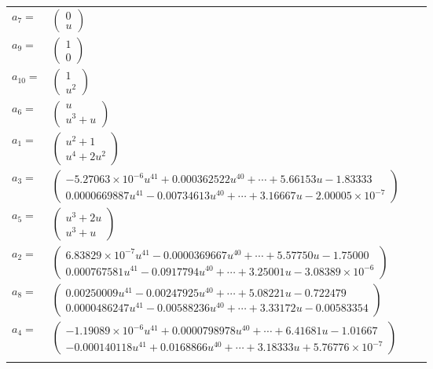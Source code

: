 \documentclass[1p]{elsarticle_modified}
\theoremstyle{definition}
\begin{document}
\begin{tabular}{m{7pt} m{180pt} m{7pt} m{180pt} }
\flushright $a_{7}=$&$\begin{pmatrix}0\\u\end{pmatrix}$ \\
\flushright $a_{9}=$&$\begin{pmatrix}1\\0\end{pmatrix}$ \\
\flushright $a_{10}=$&$\begin{pmatrix}1\\u^2\end{pmatrix}$ \\
\flushright $a_{6}=$&$\begin{pmatrix}u\\u^3+u\end{pmatrix}$ \\
\flushright $a_{1}=$&$\begin{pmatrix}u^2+1\\u^4+2 u^2\end{pmatrix}$ \\
\flushright $a_{3}=$&$\begin{pmatrix}-5.27063\times10^{-6} u^{41}+0.000362522 u^{40}+\cdots+5.66153 u-1.83333\\0.0000669887 u^{41}-0.00734613 u^{40}+\cdots+3.16667 u-2.00005\times10^{-7}\end{pmatrix}$ \\
\flushright $a_{5}=$&$\begin{pmatrix}u^3+2 u\\u^3+u\end{pmatrix}$ \\
\flushright $a_{2}=$&$\begin{pmatrix}6.83829\times10^{-7} u^{41}-0.0000369667 u^{40}+\cdots+5.57750 u-1.75000\\0.000767581 u^{41}-0.0917794 u^{40}+\cdots+3.25001 u-3.08389\times10^{-6}\end{pmatrix}$ \\
\flushright $a_{8}=$&$\begin{pmatrix}0.00250009 u^{41}-0.00247925 u^{40}+\cdots+5.08221 u-0.722479\\0.0000486247 u^{41}-0.00588236 u^{40}+\cdots+3.33172 u-0.00583354\end{pmatrix}$ \\
\flushright $a_{4}=$&$\begin{pmatrix}-1.19089\times10^{-6} u^{41}+0.0000798978 u^{40}+\cdots+6.41681 u-1.01667\\-0.000140118 u^{41}+0.0168866 u^{40}+\cdots+3.18333 u+5.76776\times10^{-7}\end{pmatrix}$\\&\end{tabular}
\end{document}
